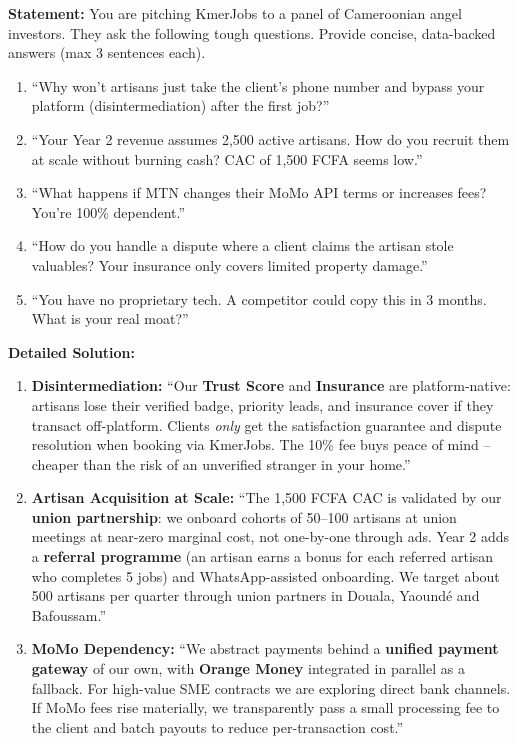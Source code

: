 \documentclass[11pt]{article}
\begin{document}
\begin{exoresolu}
\textbf{Statement:} You are pitching KmerJobs to a panel of Cameroonian angel investors. They ask the following tough questions. Provide concise, data-backed answers (max 3 sentences each).
\begin{enumerate}
    \item ``Why won't artisans just take the client's phone number and bypass your platform (disintermediation) after the first job?''
    \item ``Your Year 2 revenue assumes 2,500 active artisans. How do you recruit them at scale without burning cash? CAC of 1,500 FCFA seems low.''
    \item ``What happens if MTN changes their MoMo API terms or increases fees? You're 100\% dependent.''
    \item ``How do you handle a dispute where a client claims the artisan stole valuables? Your insurance only covers limited property damage.''
    \item ``You have no proprietary tech. A competitor could copy this in 3 months. What is your real moat?''
\end{enumerate}
\tcblower
\textbf{Detailed Solution:}
\begin{enumerate}
    \item \textbf{Disintermediation:} ``Our \textbf{Trust Score} and \textbf{Insurance} are platform-native: artisans lose their verified badge, priority leads, and insurance cover if they transact off-platform. Clients \emph{only} get the satisfaction guarantee and dispute resolution when booking via KmerJobs. The 10\% fee buys peace of mind -- cheaper than the risk of an unverified stranger in your home.''
    \item \textbf{Artisan Acquisition at Scale:} ``The 1,500 FCFA CAC is validated by our \textbf{union partnership}: we onboard cohorts of 50--100 artisans at union meetings at near-zero marginal cost, not one-by-one through ads. Year 2 adds a \textbf{referral programme} (an artisan earns a bonus for each referred artisan who completes 5 jobs) and WhatsApp-assisted onboarding. We target about 500 artisans per quarter through union partners in Douala, Yaoundé and Bafoussam.''
    \item \textbf{MoMo Dependency:} ``We abstract payments behind a \textbf{unified payment gateway} of our own, with \textbf{Orange Money} integrated in parallel as a fallback. For high-value SME contracts we are exploring direct bank channels. If MoMo fees rise materially, we transparently pass a small processing fee to the client and batch payouts to reduce per-transaction cost.''

\end{enumerate}
\end{exoresolu}
\end{document}

